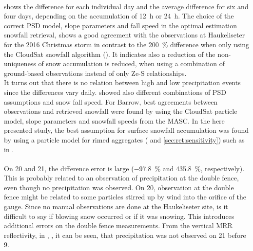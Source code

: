 \\
 shows the difference for each individual day and the average difference for six and four days, depending on the accumulation of \SI{12}{\hour} or \SI{24}{\hour}.
The choice of the correct PSD model, slope parameters and fall speed in the optimal estimation snowfall retrieval, shows a good agreement with the observations at Haukeliseter for the 2016 Christmas storm in contrast to the \SI{200}{\percent} difference when only using the CloudSat snowfall algorithm (). It indicates also a reduction of the non-uniqueness of snow accumulation is reduced, when using a combination of ground-based observations instead of only Ze-S relationships. 
\\
It turns out that there is no relation between high and low precipitation events since the differences vary daily. \citet{cooper_variational_2017} showed also different combinations of PSD assumptions and snow fall speed. For Barrow, best agreements between observations and retrieved snowfall were found by using the CloudSat particle model, slope parameters and snowfall speeds from the MASC. In the here presented study, the best assumption for surface snowfall accumulation was found by using a particle model for rimed aggregates ( and \ref{sec:ret:sensitivity}) such as in . 
\\
\\
On \num{20} and \SI{21}{\dec}, the difference error is large (\SI{-97.8}{\percent} and \SI{435.8}{\percent}, respectively). This is probably related to an observation of precipitation at the double fence, even though no precipitation was observed. 
On \SI{20}{\dec}, observation at the double fence might be related to some particles stirred up by wind into the orifice of the gauge. Since no manual observations are done at the Haukeliseter site, is it difficult to say if blowing snow occurred or if it was snowing. This introduces additional errors on the double fence measurements. From the vertical MRR reflectivity, in , , it can be seen, that precipitation was not observed on \SI{21}{\dec} before \SI{9}{\UTC}.

